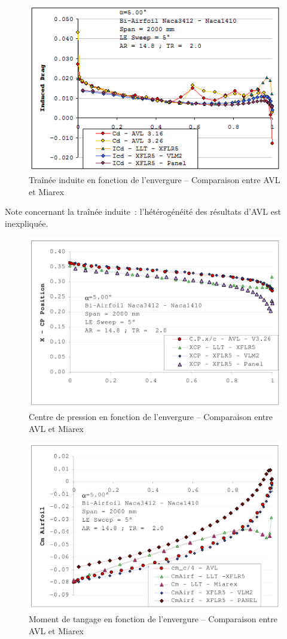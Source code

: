 \documentclass[a4paper,twoside,12pt,dvips]{article}
\begin{document}
\begin{figure}[!ht]
  \centering
  \includegraphics[width=0.75\linewidth]{img-43}
  \caption{Traînée induite en fonction de l’envergure – Comparaison entre AVL et 
  Miarex}
  \label{img:comparaison_AVL_miarex_traînée_induite_envergure}
\end{figure}

Note concernant la traînée induite~: l’hétérogénéité des résultats d’AVL 
est inexpliquée.

\begin{figure}[!ht]
  \centering
  \includegraphics[width=0.75\linewidth]{img-44-fr} %
  \caption{Centre de pression en fonction de l’envergure – Comparaison entre AVL 
  et Miarex}
  \label{img:comparaison_AVL_miarex_centre_pression_envergure}
\end{figure}

\begin{figure}[!ht]
  \centering
  \includegraphics[width=0.75\linewidth]{img-45-fr} %
  \caption{Moment de tangage en fonction de l’envergure – Comparaison entre AVL
  et Miarex}
  \label{img:comparaison_AVL_miarex_moment_tangage_envergure}
\end{figure}
\end{document}
